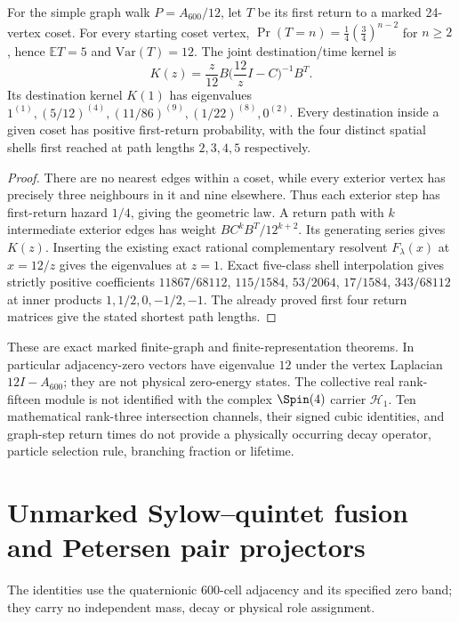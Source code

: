 \documentclass[11pt]{article}
\begin{document}
\begin{theorem}
\label{p1b:thm:600-first-return-law}
For the simple graph walk $P=A_{600}/12$, let $T$ be its first return
to a marked 24-vertex coset. For every starting coset vertex,
$\Pr(T=n)=\frac14(\frac34)^{n-2}$ for $n\ge2$, hence
$\mathbb ET=5$ and $\mathrm{Var}(T)=12$. The joint destination/time
kernel is
\[
K(z)=\frac z{12} B\bigl(\frac{12}{z}I-C\bigr)^{-1}B^T.
\]
Its destination kernel $K(1)$ has eigenvalues
$1^{(1)},(5/12)^{(4)},(11/86)^{(9)},(1/22)^{(8)},0^{(2)}$.
Every destination inside a given coset has positive first-return
probability, with the four distinct spatial shells first reached
at path lengths $2,3,4,5$ respectively.
\end{theorem}
\begin{proof}
There are no nearest edges within a coset, while every exterior
vertex has precisely three neighbours in it and nine elsewhere.
Thus each exterior step has first-return hazard $1/4$, giving the
geometric law. A return path with $k$ intermediate exterior edges
has weight $BC^kB^T/12^{k+2}$. Its generating series gives $K(z)$.
Inserting the existing exact rational complementary resolvent
$F_\lambda(x)$ at $x=12/z$ gives the eigenvalues at $z=1$.
Exact five-class shell interpolation gives strictly positive
coefficients $11867/68112$, $115/1584$, $53/2064$,
$17/1584$, $343/68112$ at inner products
$1,1/2,0,-1/2,-1$. The already proved first four return
matrices give the stated shortest path lengths.
\end{proof}

\begin{remark}
These are exact marked finite-graph and finite-representation
theorems. In particular adjacency-zero vectors have eigenvalue
$12$ under the vertex Laplacian $12I-A_{600}$; they are not
physical zero-energy states. The collective real rank-fifteen
module is not identified with the complex $\Spin(4)$ carrier
$\mathcal H_1$. Ten mathematical rank-three intersection
channels, their signed cubic identities, and graph-step return
times do not provide a physically occurring decay operator,
particle selection rule, branching fraction or lifetime.
\end{remark}

\section{Unmarked Sylow--quintet fusion and Petersen pair projectors}
The identities use the quaternionic $600$-cell adjacency and its specified
zero band; they carry no independent mass, decay or physical role assignment.
\label{p1b:sec:unmarked-sylow-fusion}
\end{document}
